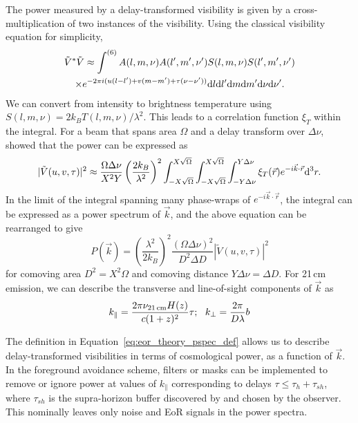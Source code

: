 The power measured by a delay-transformed visibility is given by a cross-multiplication of two instances of the visibility. Using the classical visibility equation for simplicity,
\begin{multline}
\tilde{V}^*\tilde{V} \approx \int^{(6)} A(l,m,\nu)A(l',m',\nu') S(l,m,\nu) S(l',m',\nu')\\
					\times e^{-2\pi i (u (l-l') + v (m-m') + \tau (\nu - \nu'))} {\rm d}l {\rm d}l' {\rm d}m {\rm d}m' {\rm d}\nu {\rm d}\nu'.
\end{multline}
We can convert from intensity to brightness temperature using $S(l,m,\nu) = 2k_BT(l,m,\nu)/\lambda^2$. 
This leads to a correlation function $\xi_{T}$ within the integral.
For a beam that spans area $\Omega$ and a delay transform over $\Delta\nu$, \cite{Parsons.12a} showed that the power can be expressed as
\begin{equation}
| \tilde{V}(u,v,\tau) |^2 \approx \frac{\Omega\Delta\nu}{X^2 Y} \left(\frac{2k_B}{\lambda^2}\right)^2 \int^{X\sqrt{\Omega}}_{-X\sqrt{\Omega}} \int^{X\sqrt{\Omega}}_{-X\sqrt{\Omega}} \int^{Y\Delta\nu}_{-Y\Delta\nu} \xi_T (\vec{r})e^{-i\vec{k}\cdot\vec{r}}{\rm d}^3 r.
\end{equation}
In the limit of the integral spanning many phase-wraps of $e^{-i\vec{k}\cdot\vec{r}}$, the integral can be expressed as a power spectrum of $\vec{k}$, and the above equation can be rearranged to give
\begin{equation}
P(\vec{k}) = \left(\frac{\lambda^2}{2k_B}\right)^2 \frac{(\Omega \Delta\nu)^2}{D^2 \Delta D} | \tilde{V}(u,v,\tau) |^2
\label{eq:eor_theory_pspec_def}
\end{equation}
for comoving area $D^2 = X^2\Omega$ and comoving distance $Y\Delta\nu = \Delta D$. For 21\,cm emission, we can describe the transverse and line-of-sight components of $\vec{k}$ as
\begin{equation}
k_{\parallel} = \frac{2\pi\nu_{\rm 21\,cm}H(z)}{c(1+z)^2}\tau ;\,\,\,\,k_{\perp} = \frac{2\pi}{D\lambda}b
\end{equation}

The definition in Equation~\ref{eq:eor_theory_pspec_def} allows us to describe delay-transformed visibilities in terms of cosmological power, as a function of $\vec{k}$. In the foreground avoidance scheme, filters or masks can be implemented to remove or ignore power at values of $k_{\parallel}$ corresponding to delays $\tau \leq \tau_h + \tau_{sh}$, where $\tau_{sh}$ is the supra-horizon buffer discovered by \cite{Pober.13} and chosen by the observer. This nominally leaves only noise and EoR signals in the power spectra.

